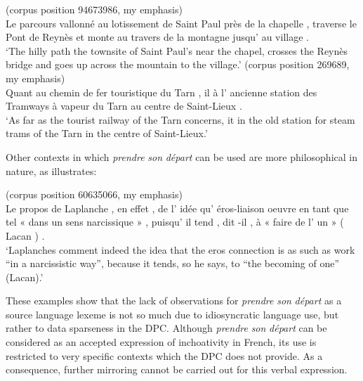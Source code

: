\ea (corpus position 94673986, my emphasis)\label{ex:3:5}\\
Le parcours vallonné  au lotissement de Saint Paul près de la chapelle , traverse le Pont de Reynès et monte au travers de la montagne jusqu' au village .\\\relax
\glt `The hilly path  the townsite of Saint Paul’s near the chapel, crosses the Reynès bridge and goes up across the mountain to the village.' 
\z
\ea (corpus position 269689, my emphasis)\label{ex:3:6}\\
Quant au chemin de fer touristique du Tarn , il  à l' ancienne station des Tramways à vapeur du Tarn au centre de Saint-Lieux .\\\relax
\glt `As far as the tourist railway of the Tarn concerns, it  in the old station for steam trams of the Tarn in the centre of Saint-Lieux.'
\z

Other contexts in which \textit{prendre} \textit{son} \textit{départ} can be used are more philosophical in nature, as  illustrates:

\ea(corpus position 60635066, my emphasis)\label{ex:3:7}\\
Le propos de Laplanche  , en effet , de l' idée qu' éros-liaison oeuvre en tant que tel « dans un sens narcissique » , puisqu' il tend , dit -il , à « faire de l' un » ( Lacan ) .\\\relax
\glt `Laplanches comment indeed  the idea that the eros connection is as such as work “in a narcissistic way”, because it tends, so he says, to “the becoming of one” (Lacan).'
\z

These examples show that the lack of observations for \textit{prendre} \textit{son} \textit{départ} as a source language lexeme is not so much due to idiosyncratic language use, but rather to data sparseness in the DPC. Although \textit{prendre} \textit{son} \textit{départ} can be considered as an accepted expression of inchoativity in French, its use is restricted to very specific contexts which the DPC does not provide. As a consequence, further mirroring cannot be carried out for this verbal expression.\largerpage[-3]

